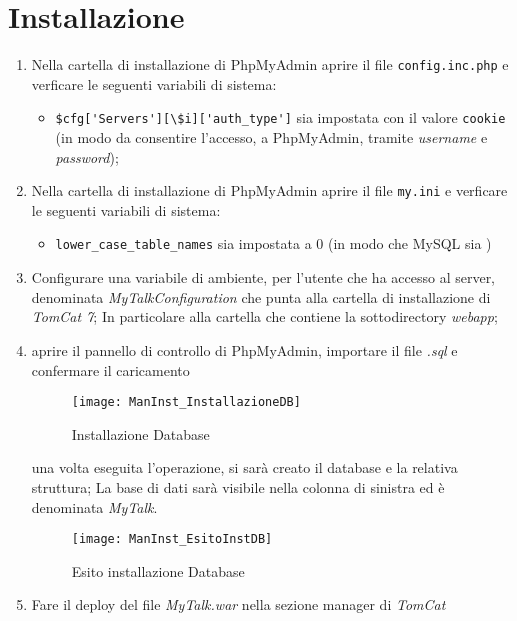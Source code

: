 \section{Installazione}
\begin{enumerate}
\item Nella cartella di installazione di PhpMyAdmin aprire il file \texttt{config.inc.php} e verficare le seguenti variabili di sistema:
\begin{itemize}
\item \verb+$cfg['Servers'][\$i]['auth_type']+ sia impostata con il valore \texttt{cookie} (in modo da consentire l'accesso, a PhpMyAdmin, tramite \textit{username} e \textit{password});
\end{itemize}
\item Nella cartella di installazione di PhpMyAdmin aprire il file \texttt{my.ini} e verficare le seguenti variabili di sistema:
\begin{itemize}
\item \texttt{lower\_case\_table\_names} sia impostata a 0 (in modo che MySQL sia )
\end{itemize}
\item Configurare una variabile di ambiente, per l'utente che ha accesso al server, denominata \textit{MyTalkConfiguration} che punta alla cartella di installazione di \textit{TomCat 7}; In particolare alla cartella che contiene la sottodirectory \textit{webapp};

\item aprire il pannello di controllo di PhpMyAdmin, importare il file \textit{.sql} e confermare il caricamento

\begin{figure}[H]
  \texttt{[image: ManInst\_InstallazioneDB]}
\caption{Installazione Database}\label{fig:InstallazioneDB}
\end{figure}
una volta eseguita l'operazione, si sarà creato il database e la relativa struttura; La base di dati sarà visibile nella colonna di sinistra ed è denominata \textit{MyTalk}.

\begin{figure}[H]
  \texttt{[image: ManInst\_EsitoInstDB]}
\caption{Esito installazione Database}\label{fig:EsitoInstDB}
\end{figure}


\item Fare il deploy del file \textit{MyTalk.war} nella sezione manager di \textit{TomCat}


\end{enumerate}
